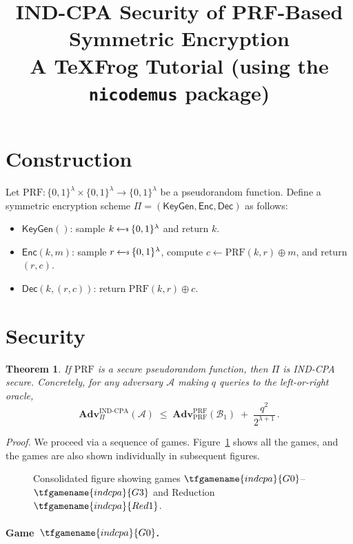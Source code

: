 \documentclass{article}
\title{IND-CPA Security of PRF-Based Symmetric Encryption\\
{\large A TeXFrog Tutorial (using the \texttt{nicodemus} package)}}
\author{}
\date{}
\newtheorem{theorem}{Theorem}
\begin{document}
\maketitle

\section{Construction}

Let $\mathrm{PRF}\colon \{0,1\}^\lambda \times \{0,1\}^\lambda \to \{0,1\}^\lambda$
be a pseudorandom function.
Define a symmetric encryption scheme $\Pi = (\mathsf{KeyGen}, \mathsf{Enc}, \mathsf{Dec})$ as follows:
\begin{itemize}
  \item $\mathsf{KeyGen}()$: sample $k \getsr \{0,1\}^\lambda$ and return $k$.
  \item $\mathsf{Enc}(k, m)$: sample $r \getsr \{0,1\}^\lambda$, compute
    $c \gets \mathrm{PRF}(k, r) \oplus m$, and return $(r, c)$.
  \item $\mathsf{Dec}(k, (r, c))$: return $\mathrm{PRF}(k, r) \oplus c$.
\end{itemize}

\section{Security}

\begin{theorem}
If\/ $\mathrm{PRF}$ is a secure pseudorandom function, then $\Pi$ is IND-CPA secure.
Concretely, for any adversary $\mathcal{A}$ making $q$ queries to the
left-or-right oracle,
\[
  \mathbf{Adv}^{\mathrm{IND\text{-}CPA}}_\Pi(\mathcal{A})
  \;\leq\;
  \mathbf{Adv}^{\mathrm{PRF}}_{\mathrm{PRF}}(\mathcal{B}_1)
  \;+\; \frac{q^2}{2^{\lambda+1}} \,.
\]
\end{theorem}

\noindent\textit{Proof.}\quad
We proceed via a sequence of games. Figure~\ref{fig:all-games} shows all the games, and the games are also shown individually in subsequent figures.

\begin{figure}[ht]
\centering
{}
\caption{Consolidated figure showing games $\tfgamename{indcpa}{G0}$--$\tfgamename{indcpa}{G3}$ and Reduction $\tfgamename{indcpa}{Red1}$.}
\label{fig:all-games}
\end{figure}

\paragraph{Game~$\tfgamename{indcpa}{G0}$.}

\end{document}
